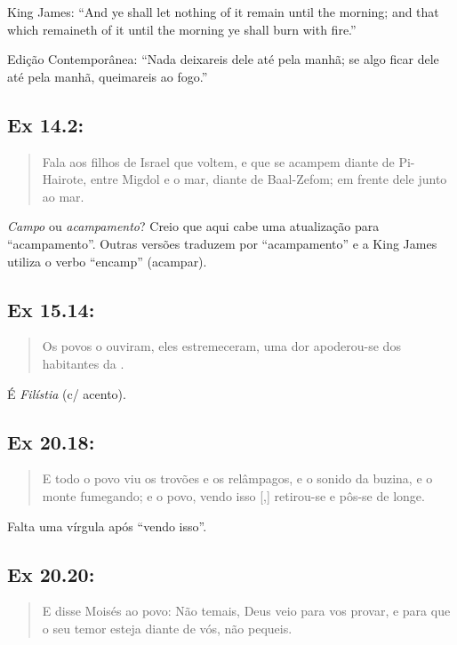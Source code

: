 King James: ``And ye shall let nothing of it remain until the morning; and that which remaineth of it until the morning ye shall burn with fire.''

Edição Contemporânea: ``Nada deixareis dele até pela manhã; se algo ficar dele até pela manhã, queimareis ao fogo.''

\subsection{Ex 14.2:}
\begin{quote}
    \small
Fala aos filhos de Israel que voltem, e que se acampem diante de Pi-Hairote, entre Migdol e o mar, diante de Baal-Zefom; em frente dele  junto ao mar.
\end{quote}

\emph{Campo} ou \emph{acampamento}? Creio que aqui cabe uma atualização para ``acampamento''. Outras versões traduzem por ``acampamento'' e a King James utiliza o verbo ``encamp'' (acampar). 

\subsection{Ex 15.14:}
\begin{quote}
    \small
Os povos o ouviram, eles estremeceram, uma dor apoderou-se dos habitantes da .
\end{quote}

É \emph{Filístia} (c/ acento).

\subsection{Ex 20.18:}
\begin{quote}
    \small
E todo o povo viu os trovões e os relâmpagos, e o sonido da buzina, e o monte fumegando; e o povo, vendo isso [,] retirou-se e pôs-se de longe.
\end{quote}

Falta uma vírgula após ``vendo isso''.

\subsection{Ex 20.20:}
\begin{quote}
    \small
E disse Moisés ao povo: Não temais, Deus veio para vos provar, e para que o seu temor esteja diante de vós,  não pequeis.
\end{quote}

